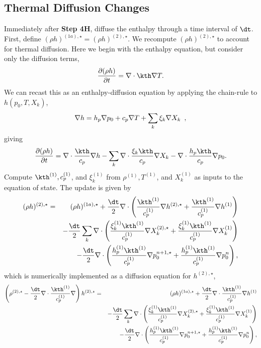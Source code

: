 \subsection{Thermal Diffusion Changes}
Immediately after {\bf Step 4H}, diffuse the enthalpy through 
a time interval of $\dt$.  First, define $(\rho h)^{(1a),\star} = (\rho h)^{(2),\star}$.  
We recompute $(\rho h)^{(2),\star}$ to account for thermal diffusion.  Here we begin
with the enthalpy equation, but consider only the 
diffusion terms,
\begin{equation}
\frac{\partial (\rho h)}{\partial t} = \nabla\cdot\kth\nabla T.
  \end{equation}
We can recast this as an enthalpy-diffusion equation by applying the
chain-rule to $h(p_0,T,X_k)$,
\begin{equation}
\nabla h = h_p \nabla p_0 + c_p \nabla T + \sum_k \xi_k \nabla X_k \enskip ,
\end{equation}
giving
\begin{equation}
  \frac{\partial (\rho h)}{\partial t}  = 
 \nabla\cdot \frac{\kth}{c_p}\nabla h -  
 \sum_k \nabla\cdot \frac{\xi_k \kth}{c_p}\nabla X_k -
 \nabla\cdot \frac{h_p \kth}{c_p}\nabla p_0.
  \end{equation}
Compute $\kth^{(1)}, c_p^{(1)}$, and $\xi_k^{(1)}$ from $\rho^{(1)}, T^{(1)}$, and $X_k^{(1)}$ as inputs to the equation of state.  The update is given by
\begin{eqnarray}
(\rho h)^{(2),\star} &=& (\rho h)^{(1a),\star} + \frac{\dt}{2}\nabla\cdot\left(\frac{\kth^{(1)}}{c_p^{(1)}}\nabla h^{(2),\star} + \frac{\kth^{(1)}}{c_p^{(1)}}\nabla h^{(1)}\right)\nonumber\\
&&- \frac{\dt}{2}\sum_k\nabla\cdot\left(\frac{\xi_k^{(1)}\kth^{(1)}}{c_p^{(1)}}\nabla X_k^{(2),\star} + \frac{\xi_k^{(1)}\kth^{(1)}}{c_p^{(1)}}\nabla X_k^{(1)}\right)\nonumber\\
&&- \frac{\dt}{2}\nabla\cdot\left(\frac{h_p^{(1)}\kth^{(1)}}{c_p^{(1)}}\nabla p_0^{n+1,\star} + \frac{h_p^{(1)}\kth^{(1)}}{c_p^{(1)}}\nabla p_0^{n}\right),
\end{eqnarray}
which is numerically implemented as a diffusion equation for $h^{(2),\star}$,
\begin{eqnarray}
\left(\rho^{(2),\star} - \frac{\dt}{2}\nabla\cdot\frac{\kth^{(1)}}{c_p^{(1)}}\nabla\right)h^{(2),\star} &=& (\rho h)^{(1a),\star} + \frac{\dt}{2}\nabla\cdot\frac{\kth^{(1)}}{c_p^{(1)}}\nabla h^{(1)}\nonumber\\
&&- \frac{\dt}{2}\sum_k\nabla\cdot\left(\frac{\xi_k^{(1)}\kth^{(1)}}{c_p^{(1)}}\nabla X_k^{(2),\star} + \frac{\xi_k^{(1)}\kth^{(1)}}{c_p^{(1)}}\nabla X_k^{(1)}\right)\nonumber\\
&&- \frac{\dt}{2}\nabla\cdot\left(\frac{h_p^{(1)}\kth^{(1)}}{c_p^{(1)}}\nabla p_0^{n+1,\star} + \frac{h_p^{(1)}\kth^{(1)}}{c_p^{(1)}}\nabla p_0^{n}\right),
\end{eqnarray}

